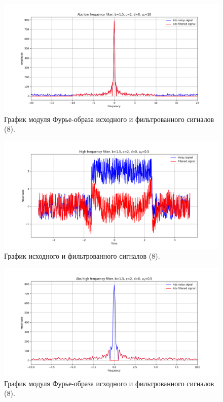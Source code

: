 \documentclass[a4paper, 12pt]{article}
\begin{document}
    \begin{figure}[H]
        \centering
        \includegraphics[scale=0.48]{8_1_abs_u_U_nospec.png}
        \captionsetup{skip=0pt}
        \caption{График модуля Фурье-образа исходного и фильтрованного сигналов (8).}
        \label{fig:dddd}
    \end{figure}
    \begin{figure}[!htb]
        \centering
        \includegraphics[scale=0.48]{8_2_u_flt_u_nospec.png}
        \captionsetup{skip=0pt}
        \caption{График исходного и фильтрованного сигналов (8).}
        \label{fig:ssss}
    \end{figure}
    \begin{figure}[!htb]
        \centering
        \includegraphics[scale=0.48]{8_2_abs_u_U_nospec.png}
        \captionsetup{skip=0pt}
        \caption{График модуля Фурье-образа исходного и фильтрованного сигналов (8).}
        \label{fig:ppppp}
    \end{figure}
\end{document}

